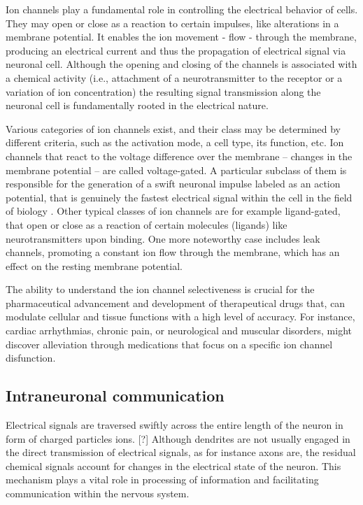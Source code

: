 \documentclass[class={myRUCProject}, crop=false]{standalone}
\begin{document}
Ion channels play a fundamental role in controlling the electrical behavior of cells. 
They may open or close as a reaction to certain impulses, like alterations in a membrane potential. It enables the ion movement - flow - through the membrane, producing an electrical current and thus the propagation of electrical signal via neuronal cell. 
Although the opening and closing of the channels is associated with a chemical activity (i.e., attachment of a neurotransmitter to the receptor or a variation of ion concentration) the resulting signal transmission along the neuronal cell is fundamentally rooted in the electrical nature.

Various categories of ion channels exist, and their class may be determined by different criteria, such as the activation mode, a cell type, its function, etc. 
Ion channels that react to the voltage difference over the membrane – changes in the membrane potential – are called voltage-gated. 
A particular subclass of them is responsible for the generation of a swift neuronal impulse labeled as an action potential, that is genuinely the fastest electrical signal within the cell in the field of biology \cite{lovinger2008communication}.  
Other typical classes of ion channels are for example ligand-gated, that open or close as a reaction of certain molecules (ligands) like neurotransmitters upon binding. 
One more noteworthy case includes leak channels, promoting a constant ion flow through the membrane, which has an effect on the resting membrane potential.

The ability to understand the ion channel selectiveness is crucial for the pharmaceutical advancement and development of therapeutical drugs that, can modulate cellular and tissue functions with a high level of accuracy. For instance, cardiac arrhythmias, chronic pain, or neurological and muscular disorders, might discover alleviation through medications that focus on a specific ion channel disfunction.


\subsection*{Intraneuronal communication}

Electrical signals are traversed swiftly across the entire length of the neuron in form of charged particles
ions. [?] Although dendrites are not usually engaged in the direct transmission of electrical signals, as for instance axons
are, the residual chemical signals account for changes in the electrical state of the neuron.
This mechanism plays a vital role in processing of information and facilitating communication within the nervous system.
 
\end{document}

